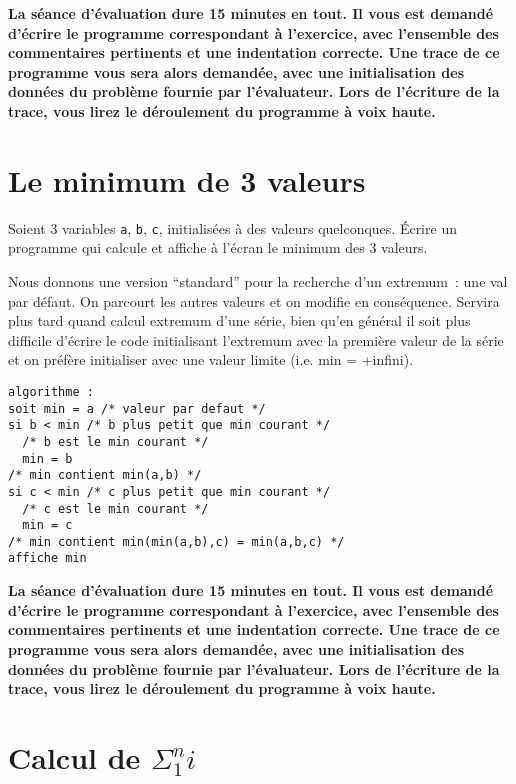 \newpage
\textbf{La séance d'évaluation dure 15 minutes en tout. Il vous est demandé d'écrire le programme correspondant à l'exercice, avec l'ensemble des commentaires pertinents et une indentation correcte. Une trace de ce programme vous sera alors demandée, avec une initialisation des données du problème fournie par l'évaluateur. Lors de l'écriture de la trace, vous lirez le déroulement du programme à voix haute.}

\section{Le minimum de 3 valeurs}

Soient 3 variables \verb|a|, \verb|b|, \verb|c|, initialisées à des
valeurs quelconques. Écrire un programme qui calcule et affiche à
l'écran le minimum des 3 valeurs.

\begin{correction}
Nous donnons une version ``standard'' pour la recherche d'un
extremum~: une val par défaut. On parcourt les autres valeurs et on
modifie en
conséquence. Servira plus tard quand calcul extremum d'une série, bien
qu'en général il soit plus difficile d'écrire le code initialisant
l'extremum avec la première valeur de la série et on préfère
initialiser avec une valeur limite (i.e. min = +infini).  
\begin{verbatim}
algorithme :
soit min = a /* valeur par defaut */
si b < min /* b plus petit que min courant */
  /* b est le min courant */
  min = b
/* min contient min(a,b) */
si c < min /* c plus petit que min courant */
  /* c est le min courant */
  min = c
/* min contient min(min(a,b),c) = min(a,b,c) */
affiche min
\end{verbatim}
\begin{listing}{1}
\end{listing}
\end{correction}

\newpage
\textbf{La séance d'évaluation dure 15 minutes en tout. Il vous est demandé d'écrire le programme correspondant à l'exercice, avec l'ensemble des commentaires pertinents et une indentation correcte. Une trace de ce programme vous sera alors demandée, avec une initialisation des données du problème fournie par l'évaluateur. Lors de l'écriture de la trace, vous lirez le déroulement du programme à voix haute.}

\section{Calcul de $\Sigma_1^n i$}

